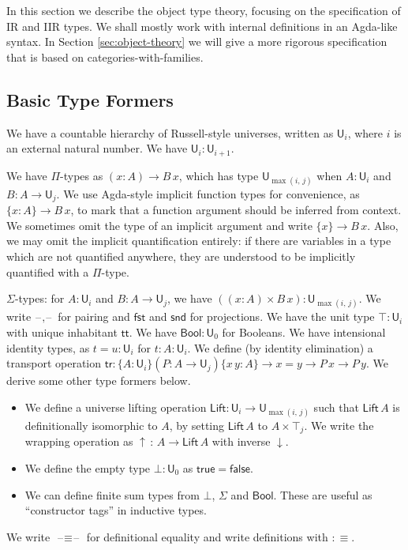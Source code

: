\documentclass[acmsmall,screen,review,anonymous]{acmart}
\newcommand{\msf}[1]{{\mathsf{#1}}}
\newcommand{\U}{\msf{U}}
\newcommand{\Lift}{\msf{Lift}}
\newcommand{\lup}{\uparrow}
\newcommand{\ldown}{\downarrow}
\newcommand{\ttt}{\msf{tt}}
\newcommand{\blank}{{\mathord{\hspace{1pt}\text{--}\hspace{1pt}}}}
\newcommand{\tr}{\msf{tr}}
\newcommand{\fst}{\msf{fst}}
\newcommand{\snd}{\msf{snd}}
\newcommand{\Bool}{\msf{Bool}}
\newcommand{\true}{\msf{true}}
\newcommand{\false}{\msf{false}}
\begin{document}
In this section we describe the object type theory, focusing on the specification of IR and IIR
types. We shall mostly work with internal definitions in an Agda-like syntax. In Section
\ref{sec:object-theory} we will give a more rigorous specification that is based on
categories-with-families.

\subsection{Basic Type Formers}\label{sec:basic-type-formers}
We have a countable hierarchy of Russell-style universes, written as $\U_i$, where $i$ is an
external natural number. We have $\U_i : \U_{i + 1}$.

We have $\Pi$-types as $(x : A) \to B\,x$, which has type $\U_{\max(i,\,j)}$ when $A : \U_i$ and $B
: A \to \U_j$. We use Agda-style implicit function types for convenience, as $\{x : A\} \to B\,x$,
to mark that a function argument should be inferred from context. We sometimes omit the type of an
implicit argument and write $\{x\} \to B\,x$.  Also, we may omit the implicit quantification
entirely: if there are variables in a type which are not quantified anywhere, they are understood
to be implicitly quantified with a $\Pi$-type.

$\Sigma$-types: for $A : \U_i$ and $B : A \to \U_j$, we have $((x : A) \times B\,x) :
\U_{\max(i,\,j)}$.  We write $\blank,\blank$ for pairing and $\fst$ and $\snd$ for projections. We
have the unit type $\top : \U_i$ with unique inhabitant $\ttt$. We have $\Bool : \U_0$ for
Booleans. We have intensional identity types, as $t = u : \U_i$ for $t : A : \U_i$. We define (by
identity elimination) a transport operation $\tr : \{A : \U_i\}(P : A \to \U_j)\{x\,y : A\} \to x =
y \to P\,x \to P\,y$. We derive some other type formers below.
\begin{itemize}
  \item We define a universe lifting operation $\Lift : \U_i \to \U_{\max(i,\,j)}$ such that
    $\Lift\,A$ is definitionally isomorphic to $A$, by setting $\Lift\,A$ to $A \times \top_j$. We
    write the wrapping operation as $\lup\,:\,A \to \Lift\,A$ with inverse $\ldown$.
  \item We define the empty type $\bot : \U_0$ as $\true = \false$.
  \item We can define finite sum types from $\bot$, $\Sigma$ and $\Bool$. These are useful
    as ``constructor tags'' in inductive types.
\end{itemize}
We write $\blank\!\!\equiv\!\!\blank$ for definitional equality and write definitions with $:\equiv$.
\end{document}
